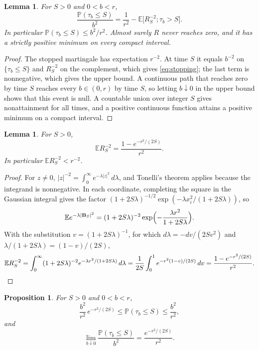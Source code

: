 \documentclass[11pt]{amsart}
\newtheorem{proposition}[theorem]{Proposition}
\newtheorem{lemma}[theorem]{Lemma}
\theoremstyle{remark}
\newcommand{\E}{\mathbb E}
\newcommand{\Pp}{\mathbb P}
\begin{document}
\begin{lemma}\label{lem:stopping}
For $S>0$ and $0<b<r$,
\begin{equation}\label{eq:stopping}
 \frac{\Pp(\tau_b\le S)}{b^2}=\frac1{r^2}-\E\bigl[R_S^{-2};\tau_b>S\bigr].
\end{equation}
In particular $\Pp(\tau_b\le S)\le b^2/r^2$. Almost surely $R$ never reaches zero, and it has a strictly positive minimum on every compact interval.
\end{lemma}

\begin{proof}
The stopped martingale has expectation $r^{-2}$. At time $S$ it equals $b^{-2}$ on $\{\tau_b\le S\}$ and $R_S^{-2}$ on the complement, which gives \eqref{eq:stopping}; the last term is nonnegative, which gives the upper bound. A continuous path that reaches zero by time $S$ reaches every $b\in(0,r)$ by time $S$, so letting $b\downarrow0$ in the upper bound shows that this event is null. A countable union over integer $S$ gives nonattainment for all times, and a positive continuous function attains a positive minimum on a compact interval.
\end{proof}

\begin{lemma}\label{lem:gaussian}
For $S>0$,
\begin{equation}\label{eq:gaussian}
 \E R_S^{-2}=\frac{1-e^{-r^2/(2S)}}{r^2}.
\end{equation}
In particular $\E R_S^{-2}<r^{-2}$.
\end{lemma}

\begin{proof}
For $z\ne0$, $|z|^{-2}=\int_0^\infty e^{-\lambda|z|^2}\,d\lambda$, and Tonelli's theorem applies because the integrand is nonnegative. In each coordinate, completing the square in the Gaussian integral gives the factor $(1+2S\lambda)^{-1/2}\exp(-\lambda x_i^2/(1+2S\lambda))$, so
\[
 \E e^{-\lambda|\mathbf B_S|^2}=(1+2S\lambda)^{-2}\exp\Bigl(-\frac{\lambda r^2}{1+2S\lambda}\Bigr).
\]
With the substitution $v=(1+2S\lambda)^{-1}$, for which $d\lambda=-dv/(2Sv^2)$ and $\lambda/(1+2S\lambda)=(1-v)/(2S)$,
\[
 \E R_S^{-2}=\int_0^\infty(1+2S\lambda)^{-2}e^{-\lambda r^2/(1+2S\lambda)}\,d\lambda
 =\frac1{2S}\int_0^1e^{-r^2(1-v)/(2S)}\,dv=\frac{1-e^{-r^2/(2S)}}{r^2}.\qedhere
\]
\end{proof}

\begin{proposition}\label{prop:hitting}
For $S>0$ and $0<b<r$,
\begin{equation}\label{eq:hitting}
 \frac{b^2}{r^2}\,e^{-r^2/(2S)}\le\Pp(\tau_b\le S)\le\frac{b^2}{r^2},
\end{equation}
and
\begin{equation}\label{eq:hittinglimit}
 \lim_{b\downarrow0}\frac{\Pp(\tau_b\le S)}{b^2}=\frac{e^{-r^2/(2S)}}{r^2}.
\end{equation}
\end{proposition}
\end{document}
